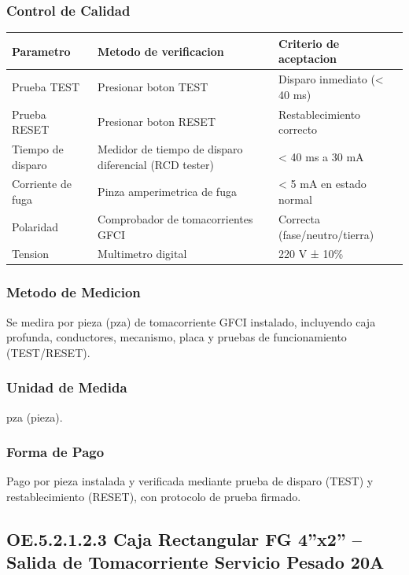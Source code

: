 \subsubsection{Control de Calidad}

\begin{longtable}{L{4.5cm} L{4.5cm} L{4.5cm}}
\toprule
\textbf{Parametro} & \textbf{Metodo de verificacion} & \textbf{Criterio de aceptacion} \\
\midrule
Prueba TEST & Presionar boton TEST & Disparo inmediato (< 40 ms) \\
Prueba RESET & Presionar boton RESET & Restablecimiento correcto \\
Tiempo de disparo & Medidor de tiempo de disparo diferencial (RCD tester) & < 40 ms a 30 mA \\
Corriente de fuga & Pinza amperimetrica de fuga & < 5 mA en estado normal \\
Polaridad & Comprobador de tomacorrientes GFCI & Correcta (fase/neutro/tierra) \\
Tension & Multimetro digital & 220 V ± 10\% \\
\bottomrule
\end{longtable}

\subsubsection{Metodo de Medicion}

Se medira por pieza (pza) de tomacorriente GFCI instalado, incluyendo caja profunda, conductores, mecanismo, placa y pruebas de funcionamiento (TEST/RESET).

\subsubsection{Unidad de Medida}

pza (pieza).

\subsubsection{Forma de Pago}

Pago por pieza instalada y verificada mediante prueba de disparo (TEST) y restablecimiento (RESET), con protocolo de prueba firmado.

\subsection{OE.5.2.1.2.3 Caja Rectangular FG 4''x2'' -- Salida de Tomacorriente Servicio Pesado 20A}

